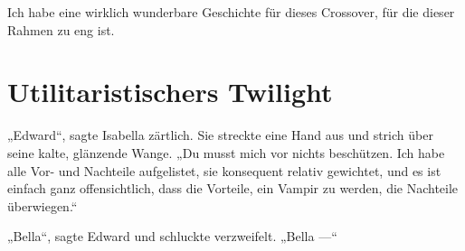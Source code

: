Ich habe eine wirklich wunderbare Geschichte für dieses Crossover, für die dieser Rahmen zu eng ist.

\section{Utilitaristischers Twilight\protect\footnotemark}

„Edward“, sagte Isabella zärtlich. Sie streckte eine Hand aus und strich über seine kalte, glänzende Wange.
„Du musst mich vor nichts beschützen. Ich habe alle Vor- und Nachteile aufgelistet, sie konsequent relativ gewichtet, und es ist einfach ganz offensichtlich, dass die Vorteile, ein Vampir zu werden, die Nachteile überwiegen.“

„Bella“, sagte Edward und schluckte verzweifelt.
„Bella —“

